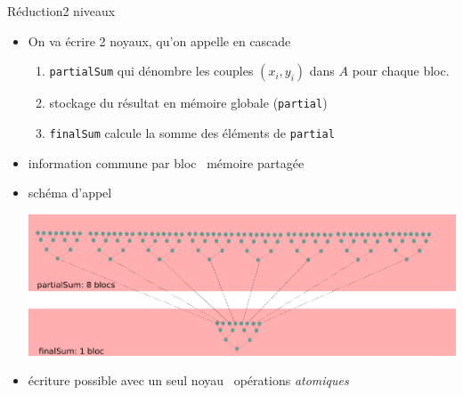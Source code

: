 \documentclass[11pt,mathserif]{beamer}
\newcommand{\scout}{\faAngellist}
\newcommand{\gezi}{\faLongArrowRight}
\newcommand{\argi}{\faLightbulbO}
\newcommand{\kontuz}{\faExclamationTriangle}
\begin{document}
\begin{frame}{Réduction}{2 niveaux} 
 \begin{itemize}[<+->]
   \item[\scout] On va écrire 2 noyaux, qu'on appelle en cascade
 \begin{enumerate}
   \item {\tt partialSum} qui dénombre les couples $(x_i,y_i)$ dans $A$ pour chaque bloc. 
   \item stockage du résultat en mémoire globale ({\tt partial})
   \item {\tt finalSum} calcule la somme des éléments de {\tt partial}
 \end{enumerate}
   \item[\kontuz] information commune par bloc \gezi\ mémoire partagée
   \item[\argi] schéma d'appel
     
     \begin{center}  
  \includegraphics[width=0.6\linewidth]{fig/biKernels.eps}
     \end{center}  
   \item[\argi] écriture possible avec un seul noyau \gezi\ opérations {\em atomiques}
  \end{itemize}
 \end{frame}
\end{document}
